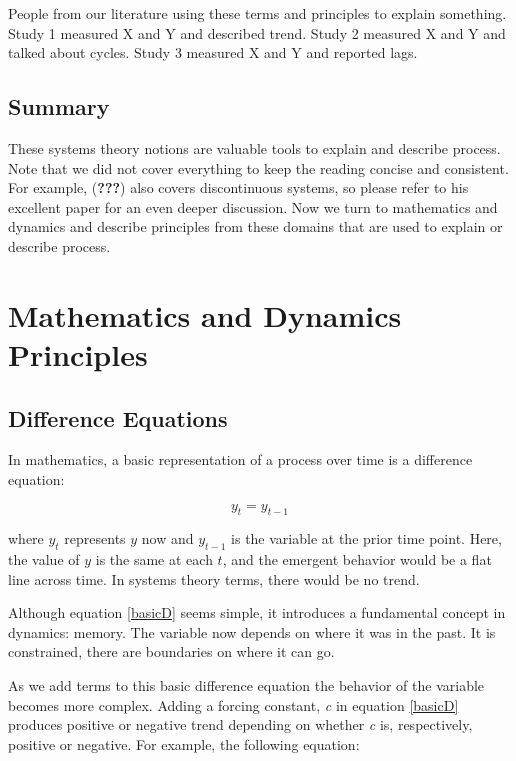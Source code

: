 \documentclass[english,,man]{apa6}
\theoremstyle{definition}
\theoremstyle{definition}
\theoremstyle{definition}
\theoremstyle{remark}
\begin{document}
People from our literature using these terms and principles to explain
something. Study 1 measured X and Y and described trend. Study 2
measured X and Y and talked about cycles. Study 3 measured X and Y and
reported lags.

\hypertarget{summary}{%
\subsection{Summary}\label{summary}}

These systems theory notions are valuable tools to explain and describe
process. Note that we did not cover everything to keep the reading
concise and consistent. For example, ({\textbf{???}}) also covers
discontinuous systems, so please refer to his excellent paper for an
even deeper discussion. Now we turn to mathematics and dynamics and
describe principles from these domains that are used to explain or
describe process.

\hypertarget{mathematics-and-dynamics-principles}{%
\section{Mathematics and Dynamics
Principles}\label{mathematics-and-dynamics-principles}}

\hypertarget{difference-equations}{%
\subsection{Difference Equations}\label{difference-equations}}

In mathematics, a basic representation of a process over time is a
difference equation:

\begin{equation}
\label{basicD}
y_{t} = y_{t - 1}
\end{equation}

\noindent where \(y_{t}\) represents \(y\) now and \(y_{t-1}\) is the
variable at the prior time point. Here, the value of \(y\) is the same
at each \(t\), and the emergent behavior would be a flat line across
time. In systems theory terms, there would be no trend.

Although equation \ref{basicD} seems simple, it introduces a fundamental
concept in dynamics: memory. The variable now depends on where it was in
the past. It is constrained, there are boundaries on where it can go.

As we add terms to this basic difference equation the behavior of the
variable becomes more complex. Adding a forcing constant, \emph{c} in
equation \ref{basicD} produces positive or negative trend depending on
whether \emph{c} is, respectively, positive or negative. For example,
the following equation:
\end{document}

